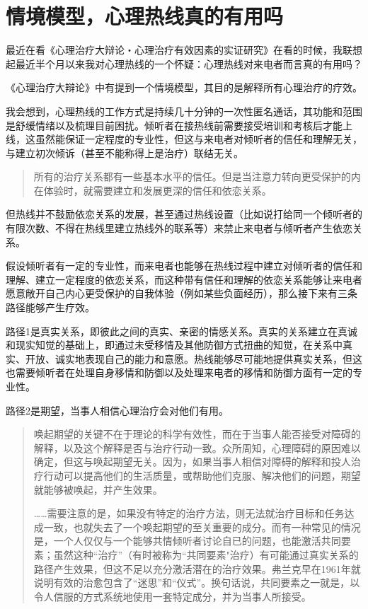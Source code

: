 \chapter{情境模型，心理热线真的有用吗}





最近在看《心理治疗大辩论・心理治疗有效因素的实证研究》在看的时候，我联想起最近半个月以来我对心理热线的一个怀疑：心理热线对来电者而言真的有用吗？

《心理治疗大辩论》中有提到一个情境模型，其目的是解释所有心理治疗的疗效。

\blockquote{

}

我会想到，心理热线的工作方式是持续几十分钟的一次性匿名通话，其功能和范围是舒缓情绪以及梳理目前困扰。倾听者在接热线前需要接受培训和考核后才能上线，这虽然能保证一定程度的专业性，但这与来电者对倾听者的信任和理解无关，与建立初次倾诉（甚至不能称得上是治疗）联结无关。

\blockquote{
	所有的治疗关系都有一些基本水平的信任。但是当注意力转向更受保护的内在体验时，就需要建立和发展更深的信任和依恋关系。

}

但热线并不鼓励依恋关系的发展，甚至通过热线设置（比如说打给同一个倾听者的有限次数、不得在热线里建立热线外的联系等）来禁止来电者与倾听者产生依恋关系。

假设倾听者有一定的专业性，而来电者也能够在热线过程中建立对倾听者的信任和理解、建立一定程度的依恋关系，而这种带有信任和理解的依恋关系能够让来电者愿意敞开自己内心更受保护的自我体验（例如某些负面经历），那么接下来有三条路径能够产生疗效。

路径1是真实关系，即彼此之间的真实、亲密的情感关系。真实的关系建立在真诚和现实知觉的基础上，即通过未受移情及其他防御方式扭曲的知觉，在关系中真实、开放、诚实地表现自己的能力和意愿。热线能够尽可能地提供真实关系，但这也需要倾听者在处理自身移情和防御以及处理来电者的移情和防御方面有一定的专业性。

路径2是期望，当事人相信心理治疗会对他们有用。

\blockquote{
	唤起期望的关键不在于理论的科学有效性，而在于当事人能否接受对障碍的解释，以及这个解释是否与治疗行动一致。众所周知，心理障碍的原因难以确定，但这与唤起期望无关。因为，如果当事人相信对障碍的解释和投人治疗行动可以提高他们的生活质量，或帮助他们克服、解决他们的问题，期望就能够被唤起，并产生效果。

	……需要注意的是，如果没有特定的治疗方法，则无法就治疗目标和任务达成一致，也就失去了一个唤起期望的至关重要的成分。而有一种常见的情况是，一个人仅仅与一个能够共情倾听者讨论自已的问题，也能激活共同要素；虽然这种“治疗”（有时被称为“共同要素"治疗）有可能通过真实关系的路径产生效果，但这不足以充分激活潜在的治疗效果。弗兰克早在1961年就说明有效的治愈包含了“迷思”和“仪式”。换句话说，共同要素之一就是，以令人信服的方式系统地使用一套特定成分，并为当事人所接受。

}

